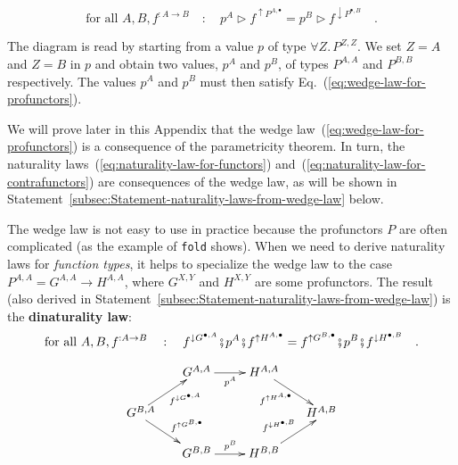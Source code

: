 ~\vspace{-0.8\baselineskip}

\begin{equation}
\text{for all }A,B,f^{:A\rightarrow B}\quad:\quad p^{A}\triangleright f^{\uparrow P^{A,\bullet}}=p^{B}\triangleright f^{\downarrow P^{\bullet,B}}\quad.\label{eq:wedge-law-for-profunctors}
\end{equation}
\vspace{-0.8\baselineskip}

\noindent The diagram is read by starting from a value $p$ of type
$\forall Z.\,P^{Z,Z}$. We set $Z=A$ and $Z=B$ in $p$ and obtain
two values, $p^{A}$ and $p^{B}$, of types $P^{A,A}$ and $P^{B,B}$
respectively. The values $p^{A}$ and $p^{B}$ must then satisfy Eq.~(\ref{eq:wedge-law-for-profunctors}). 

We will prove later in this Appendix that the wedge law~(\ref{eq:wedge-law-for-profunctors})
is a consequence of the parametricity theorem. In turn, the naturality
laws~(\ref{eq:naturality-law-for-functors}) and~(\ref{eq:naturality-law-for-contrafunctors})
are consequences of the wedge law, as will be shown in Statement~\ref{subsec:Statement-naturality-laws-from-wedge-law}
below.

The wedge law is not easy to use in practice because the profunctors
$P$ are often complicated (as the example of \lstinline!fold! shows).
When we need to derive naturality laws for \emph{function types},
it helps to specialize the wedge law to the case $P^{A,A}=G^{A,A}\rightarrow H^{A,A}$,
where $G^{X,Y}$ and $H^{X,Y}$ are some profunctors. The result (also
derived in Statement~\ref{subsec:Statement-naturality-laws-from-wedge-law})
is the \textbf{dinaturality law}:
\begin{equation}
\text{for all }A,B,f^{:A\rightarrow B}\quad:\quad f^{\downarrow G^{\bullet,A}}\bef p^{A}\bef f^{\uparrow H^{A,\bullet}}=f^{\uparrow G^{B,\bullet}}\bef p^{B}\bef f^{\downarrow H^{\bullet,B}}\quad.\label{eq:dinaturality-law-for-profunctors}
\end{equation}

\begin{wrapfigure}{l}{0.38\columnwidth}%
\vspace{-2.25\baselineskip}
\[
\xymatrix{\xyScaleY{1.5pc}\xyScaleX{2.0pc} & G^{A,A}\ar[r]\sb(0.5){p^{A}} & H^{A,A}\ar[rd]\sb(0.4){f^{\uparrow H^{A,\bullet}}}\\
G^{B,A}\negthickspace\negthickspace\negthickspace\ar[rd]\sp(0.55){\;\;f^{\uparrow G^{B,\bullet}}}\ar[ru]\sb(0.6){f^{\downarrow G^{\bullet,A}}} &  &  & \negthickspace\negthickspace\negthickspace H^{A,B}\\
 & G^{B,B}\ar[r]\sp(0.5){p^{B}} & H^{B,B}\ar[ru]\sp(0.45){f^{\downarrow H^{\bullet,B}}}
}
\]

\vspace{-1.7\baselineskip}
\end{wrapfigure}%

